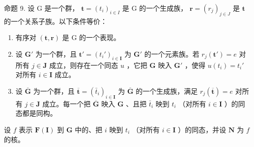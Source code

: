 命题 9. 设 G 是一个群， \(\mathbf{t} = (t_i)_{i \in I}\) 是 G 的一个生成族， \(\mathbf{r} = (r_j)_{j \in J}\) 是 \(\mathbf{t}\) 的一个关系子族。以下条件等价：

\begin{enumerate}
\def\labelenumi{(\alph{enumi})}
\item
  有序对 \((\mathbf{t},\mathbf{r})\) 是 G 的一个表现。
\item
  设 \(\mathbf{G}'\) 为一个群，且 \(\mathbf{t}' = (t_i')_{i \in \mathbf{I}}\) 为 \(\mathbf{G}'\) 的一个元素族。若 \(r_j(\mathbf{t}') = e\) 对所有 \(j \in \mathbf{J}\) 成立，则存在一个同态 \(u\) ，它把 \(\mathbf{G}\) 映入 \(\mathbf{G}'\) ，使得 \(u(t_i) = t_i'\) 对所有 \(i \in \mathbf{I}\) 成立。
\item
  设 \(\overline{\mathbf{G}}\) 为一个群，且 \(\overline{\mathbf{t}} = (\bar{t}_i)_{i\in \mathbf{I}}\) 为 \(\overline{\mathbf{G}}\) 的一个生成族，满足 \(r_j(\overline{\mathbf{t}}) = e\) 对所有 \(j\in \mathbf{J}\) 成立。每一个把 \(\overline{\mathbf{G}}\) 映入 \(\mathbf{G}\) 、且把 \(\bar{t}_i\) 映到 \(t_i\) （对所有 \(i\in \mathbf{I}\) ）的同态都是同构。
\end{enumerate}

设 \(f\) 表示 \(\mathbf{F}(\mathbf{I})\) 到 \(\mathbf{G}\) 中的、把 \(i\) 映到 \(t_i\) （对所有 \(i \in \mathbf{I}\) ）的同态，并设 \(\mathbf{N}\) 为 \(f\) 的核。

